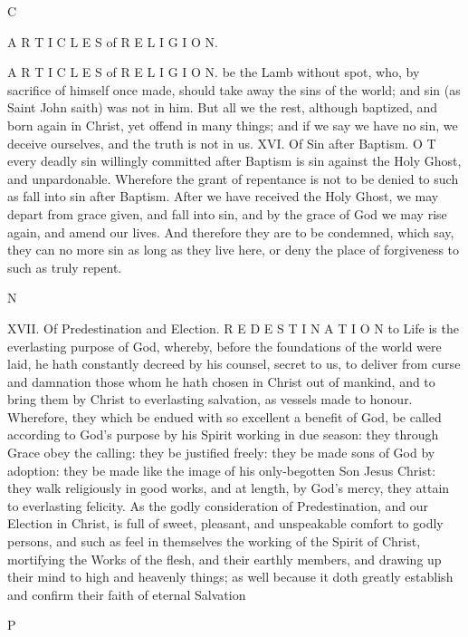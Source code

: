 C

A R T I C L E S of R E L I G I O N.

A R T I C L E S of R E L I G I O N. be the Lamb without spot, who, by sacrifice of himself once made, should take away the sins of the world; and sin (as Saint John saith) was not in him. But all we the rest, although baptized, and born again in Christ, yet offend in many things; and if we say we have no sin, we deceive ourselves, and the truth is not in us. XVI. Of Sin after Baptism. O T every deadly sin willingly committed after Baptism is sin against the Holy Ghost, and unpardonable. Wherefore the grant of repentance is not to be denied to such as fall into sin after Baptism. After we have received the Holy Ghost, we may depart from grace given, and fall into sin, and by the grace of God we may rise again, and amend our lives. And therefore they are to be condemned, which say, they can no more sin as long as they live here, or deny the place of forgiveness to such as truly repent.

N

XVII. Of Predestination and Election. R E D E S T I N A T I O N to Life is the everlasting purpose of God, whereby, before the foundations of the world were laid, he hath constantly decreed by his counsel, secret to us, to deliver from curse and damnation those whom he hath chosen in Christ out of mankind, and to bring them by Christ to everlasting salvation, as vessels made to honour. Wherefore, they which be endued with so excellent a benefit of God, be called according to God’s purpose by his Spirit working in due season: they through Grace obey the calling: they be justified freely: they be made sons of God by adoption: they be made like the image of his only-begotten Son Jesus Christ: they walk religiously in good works, and at length, by God’s mercy, they attain to everlasting felicity. As the godly consideration of Predestination, and our Election in Christ, is full of sweet, pleasant, and unspeakable comfort to godly persons, and such as feel in themselves the working of the Spirit of Christ, mortifying the Works of the flesh, and their earthly members, and drawing up their mind to high and heavenly things; as well because it doth greatly establish and confirm their faith of eternal Salvation

P

